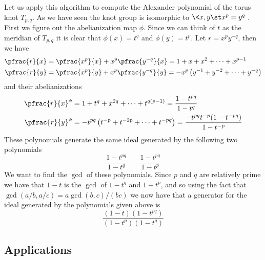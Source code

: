 Let us apply this algorithm to compute the Alexander polynomial of the torus knot $T_{p,q}$. As we have seen the knot group is isomorphic to $\< x,y \st x^p = y^q \>$. First we figure out the abelianization map $\phi$. Since we can think of $t$ as the meridian of $T_{p,q}$ it is clear that $\phi(x)=t^q$ and $\phi(y)=t^p$. Let $r=x^py^{-q}$, then we have
\begin{align*}
	\pfrac{r}{x} &= \pfrac{x^p}{x} + x^p \pfrac{y^{-q}}{x} = 1+x+x^2 + \cdots + x^{p-1} \\
	\pfrac{r}{y} &= \pfrac{x^p}{y} + x^p \pfrac{y^{-q}}{y} = -x^p \left( y^{-1} + y^{-2} + \cdots + y^{-q} \right)
\end{align*}
and their abelianizations
\begin{align*}
	\pfrac{r}{x}^\phi &= 1+t^q+x^{2q} + \cdots + t^{q(p-1)} = \frac{1-t^{pq}}{1-t^q} \\
	\pfrac{r}{y}^\phi &= -t^{pq} \left( t^{-p} + t^{-2p} + \cdots + t^{-pq} \right) = \frac{-t^{pq}t^{-p}(1-t^{-pq})}{1-t^{-p}}
\end{align*}
These polynomials generate the same ideal generated by the following two polynomials
\[ \frac{1-t^{pq}}{1-t^q} \ \ \ \ \ \ \ \ \frac{1-t^{pq}}{1-t^p} \]
We want to find the $\gcd$ of these polynomials. Since $p$ and $q$ are relatively prime we have that $1-t$ is the $\gcd$ of $1-t^q$ and $1-t^p$, and so using the fact that $\gcd(a/b,a/c) = a \gcd(b,c) / (bc)$ we now have that a generator for the ideal generated by the polynomials given above is
\[ \frac{(1-t)(1-t^{pq})}{(1-t^p)(1-t^q)} \]







\subsection{Applications}
\label{Knot Applications}




